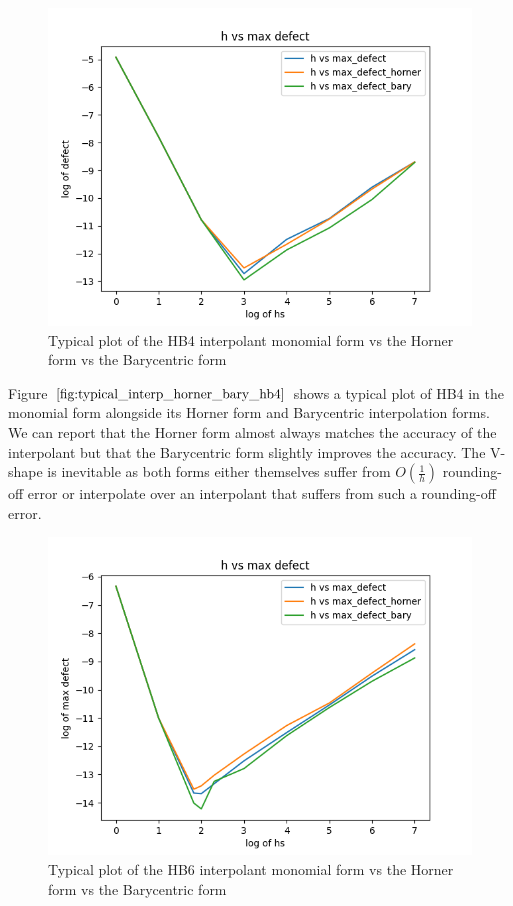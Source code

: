 \documentclass{article}
\begin{document}
\begin{figure}[H]
\centering
\includegraphics[width=0.7\linewidth]{./figures/typical_interp_horner_bary_hb4}
\caption{Typical plot of the HB4 interpolant monomial form vs the Horner form vs the Barycentric form}
\label{fig:typical_interp_horner_bary_hb4}
\end{figure}

Figure $\ref{fig:typical_interp_horner_bary_hb4}$ shows a typical plot of HB4 in the monomial form alongside its Horner form and Barycentric interpolation forms. We can report that the Horner form almost always matches the accuracy of the interpolant but that the Barycentric form slightly improves the accuracy. The V-shape is inevitable as both forms either themselves suffer from $O(\frac{1}{h})$ rounding-off error or interpolate over an interpolant that suffers from such a rounding-off error.

\begin{figure}[H]
\centering
\includegraphics[width=0.7\linewidth]{./figures/typical_interp_horner_bary_hb6}
\caption{Typical plot of the HB6 interpolant monomial form vs the Horner form vs the Barycentric form}
\label{fig:typical_interp_horner_bary_hb6}
\end{figure}
\end{document}
